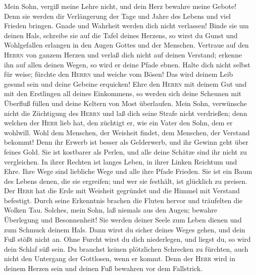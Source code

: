  Mein Sohn, vergiß meine Lehre nicht, und dein Herz
bewahre meine Gebote!  Denn sie werden dir Verlängerung
der Tage und Jahre des Lebens und viel Frieden bringen. 
Gnade und Wahrheit werden dich nicht verlassen! Binde sie um deinen
Hals, schreibe sie auf die Tafel deines Herzens,  so wirst
du Gunst und Wohlgefallen erlangen in den Augen Gottes und der Menschen.
 Vertraue auf den \textsc{Herrn} von ganzem Herzen und
verlaß dich nicht auf deinen Verstand;  erkenne ihn auf
allen deinen Wegen, so wird er deine Pfade ebnen.  Halte
dich nicht selbst für weise; fürchte den \textsc{Herrn} und weiche vom
Bösen!  Das wird deinem Leib gesund sein und deine Gebeine
erquicken!  Ehre den \textsc{Herrn} mit deinem Gut und mit
den Erstlingen all deines Einkommens,  so werden sich
deine Scheunen mit Überfluß füllen und deine Keltern von Most
überlaufen.  Mein Sohn, verwünsche nicht die Züchtigung
des \textsc{Herrn} und laß dich seine Strafe nicht verdrießen;
 denn welchen der \textsc{Herr} lieb hat, den züchtigt
er, wie ein Vater den Sohn, dem er wohlwill.  Wohl dem
Menschen, der Weisheit findet, dem Menschen, der Verstand bekommt!
 Denn ihr Erwerb ist besser als Gelderwerb, und ihr
Gewinn geht über feines Gold.  Sie ist kostbarer als
Perlen, und alle deine Schätze sind ihr nicht zu vergleichen.
 In ihrer Rechten ist langes Leben, in ihrer Linken
Reichtum und Ehre.  Ihre Wege sind liebliche Wege und
alle ihre Pfade Frieden.  Sie ist ein Baum des Lebens
denen, die sie ergreifen; und wer sie festhält, ist glücklich zu
preisen.  Der \textsc{Herr} hat die Erde mit Weisheit
gegründet und die Himmel mit Verstand befestigt.  Durch
seine Erkenntnis brachen die Fluten hervor und träufelten die Wolken
Tau.  Solches, mein Sohn, laß niemals aus den Augen;
bewahre Überlegung und Besonnenheit!  Sie werden deiner
Seele zum Leben dienen und zum Schmuck deinem Hals.  Dann
wirst du sicher deines Weges gehen, und dein Fuß stößt nicht an.
 Ohne Furcht wirst du dich niederlegen, und liegst du, so
wird dein Schlaf süß sein.  Du brauchst keinen
plötzlichen Schrecken zu fürchten, auch nicht den Untergang der
Gottlosen, wenn er kommt.  Denn der \textsc{Herr} wird in
deinem Herzen sein und deinen Fuß bewahren vor dem Fallstrick.
